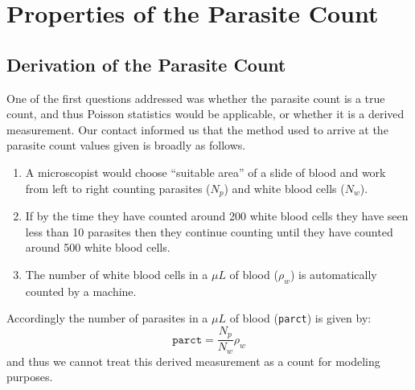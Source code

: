 \section{Properties of the Parasite Count}
\subsection{Derivation of the Parasite Count}
One of the first questions addressed was whether the parasite count is a true count, and thus Poisson statistics would be applicable, or whether it is a derived measurement. Our contact informed us that the method used to arrive at the parasite count values given is broadly as follows.
\begin{enumerate}
 \item A microscopist would choose ``suitable area'' of a slide of blood and work from left to right counting parasites ($N_p$) and white blood cells ($N_w$).
\item If by the time they have counted around 200 white blood cells they have seen less than 10 parasites then they continue counting until they have counted around 500 white blood cells.
\item The number of white blood cells in a $\mu L$ of blood ($\rho_w$) is automatically counted by a machine.
\end{enumerate}
Accordingly the number of parasites in a $\mu L$ of blood (\texttt{parct}) is given by:
$$\mathtt{parct}=\frac{N_p}{N_w}\rho_w$$
and thus we cannot treat this derived measurement as a count for modeling purposes.
